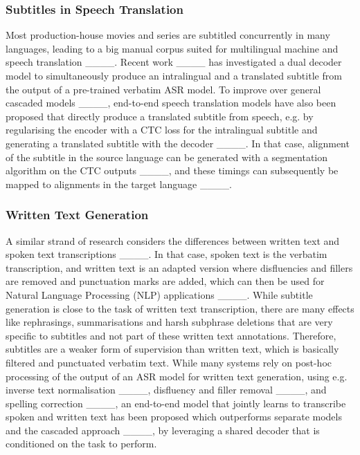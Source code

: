 \subsubsection{Subtitles in Speech Translation}
\noindent Most production-house movies and series are subtitled concurrently in many languages, leading to a big manual corpus suited for multilingual machine and speech translation ____. Recent work ____ has investigated a dual decoder model to simultaneously produce an intralingual and a translated subtitle from the output of a pre-trained verbatim ASR model. To improve over general cascaded models ____, end-to-end speech translation models have also been proposed that directly produce a translated subtitle from speech, e.g. by regularising the encoder with a CTC loss for the intralingual subtitle and generating a translated subtitle with the decoder ____. In that case, alignment of the subtitle in the source language can be generated with a segmentation algorithm on the CTC outputs ____, and these timings can subsequently be mapped to alignments in the target language ____.

\subsubsection{Written Text Generation}
\noindent A similar strand of research considers the differences between written text and spoken text transcriptions ____. In that case, spoken text is the verbatim transcription, and written text is an adapted version where disfluencies and fillers are removed and punctuation marks are added, which can then be used for Natural Language Processing (NLP) applications ____. While subtitle generation is close to the task of written text transcription, there are many effects like rephrasings, summarisations and harsh subphrase deletions that are very specific to subtitles and not part of these written text annotations. Therefore, subtitles are a weaker form of supervision than written text, which is basically filtered and punctuated verbatim text. While many systems rely on post-hoc processing of the output of an ASR model for written text generation, using e.g. inverse text normalisation ____, disfluency and filler removal ____, and spelling correction ____, an end-to-end model that jointly learns to transcribe spoken and written text has been proposed which outperforms separate models and the cascaded approach ____, by leveraging a shared decoder that is conditioned on the task to perform.

